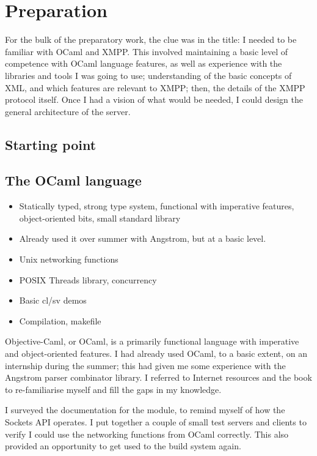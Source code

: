 \chapter{Preparation}
For the bulk of the preparatory work, the clue was in the title: I needed to be familiar with OCaml and XMPP. This involved maintaining a basic level of competence with OCaml language features, as well as experience with the libraries and tools I was going to use; understanding of the basic concepts of XML, and which features are relevant to XMPP; then, the details of the XMPP protocol itself. Once I had a vision of what would be needed, I could design the general architecture of the server.

\section{Starting point}

\section{The OCaml language}
\begin{itemize}
  \item Statically typed, strong type system, functional with imperative features, object-oriented bits, small standard library
  \item Already used it over summer with Angstrom, but at a basic level.
  \item Unix networking functions
  \item POSIX Threads library, concurrency
  \item Basic cl/sv demos
  \item Compilation, makefile
\end{itemize}

Objective-Caml, or OCaml, is a primarily functional language with imperative and object-oriented features. I had already used OCaml, to a basic extent, on an internship during the summer; this had given me some experience with the Angstrom parser combinator library. I referred to Internet resources and the  book to re-familiarise myself and fill the gaps in my knowledge.

I surveyed the documentation for the  module, to remind myself of how the Sockets API operates. I put together a couple of small test servers and clients to verify I could use the networking functions from OCaml correctly. This also provided an opportunity to get used to the build system again.

